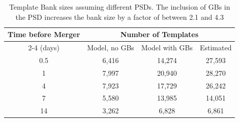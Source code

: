 
\begin{table}[h]
\begin{centering}
\begin{tabular}{|c|ccc|}
\hline
Time before Merger & \multicolumn{3}{c|}{Number of Templates} \\
\cline{2-4}
(days) & Model, no GBs & Model with GBs & Estimated \\
\hline
0.5 & 6,416 & 14,274 & 27,593  \\
1 & 7,997 & 20,940 & 28,270  \\
4 & 7,923 & 17,729 & 26,242  \\
7 & 5,580 & 13,985 & 14,051  \\
14 & 3,262 & 6,828 & 6,861  \\
\hline
\end{tabular}

\caption{Template Bank sizes assuming different \acp{PSD}.
The inclusion of \acp{GB} in the PSD increases the bank size by a factor of between 2.1 and 4.3
\label{tab:bank_size}
}
\end{centering}
\end{table}
